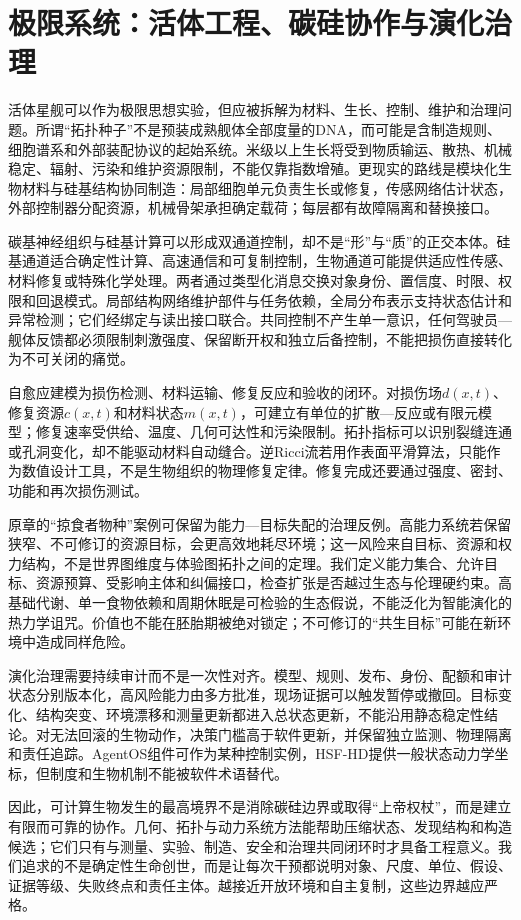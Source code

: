 \section{极限系统：活体工程、碳硅协作与演化治理}
\label{sec:tb_extreme_deduction}

活体星舰可以作为极限思想实验，但应被拆解为材料、生长、控制、维护和治理问题。所谓“拓扑种子”不是预装成熟舰体全部度量的DNA，而可能是含制造规则、细胞谱系和外部装配协议的起始系统。米级以上生长将受到物质输运、散热、机械稳定、辐射、污染和维护资源限制，不能仅靠指数增殖。更现实的路线是模块化生物材料与硅基结构协同制造：局部细胞单元负责生长或修复，传感网络估计状态，外部控制器分配资源，机械骨架承担确定载荷；每层都有故障隔离和替换接口。

碳基神经组织与硅基计算可以形成双通道控制，却不是“形”与“质”的正交本体。硅基通道适合确定性计算、高速通信和可复制控制，生物通道可能提供适应性传感、材料修复或特殊化学处理。两者通过类型化消息交换对象身份、置信度、时限、权限和回退模式。局部结构网络维护部件与任务依赖，全局分布表示支持状态估计和异常检测；它们经绑定与读出接口联合。共同控制不产生单一意识，任何驾驶员—舰体反馈都必须限制刺激强度、保留断开权和独立后备控制，不能把损伤直接转化为不可关闭的痛觉。

自愈应建模为损伤检测、材料运输、修复反应和验收的闭环。对损伤场$d(x,t)$、修复资源$c(x,t)$和材料状态$m(x,t)$，可建立有单位的扩散—反应或有限元模型；修复速率受供给、温度、几何可达性和污染限制。拓扑指标可以识别裂缝连通或孔洞变化，却不能驱动材料自动缝合。逆Ricci流若用作表面平滑算法，只能作为数值设计工具，不是生物组织的物理修复定律。修复完成还要通过强度、密封、功能和再次损伤测试。

原章的“掠食者物种”案例可保留为能力—目标失配的治理反例。高能力系统若保留狭窄、不可修订的资源目标，会更高效地耗尽环境；这一风险来自目标、资源和权力结构，不是世界图维度与体验图拓扑之间的定理。我们定义能力集合、允许目标、资源预算、受影响主体和纠偏接口，检查扩张是否越过生态与伦理硬约束。高基础代谢、单一食物依赖和周期休眠是可检验的生态假说，不能泛化为智能演化的热力学诅咒。价值也不能在胚胎期被绝对锁定；不可修订的“共生目标”可能在新环境中造成同样危险。

演化治理需要持续审计而不是一次性对齐。模型、规则、发布、身份、配额和审计状态分别版本化，高风险能力由多方批准，现场证据可以触发暂停或撤回。目标变化、结构突变、环境漂移和测量更新都进入总状态更新，不能沿用静态稳定性结论。对无法回滚的生物动作，决策门槛高于软件更新，并保留独立监测、物理隔离和责任追踪。AgentOS组件可作为某种控制实例，HSF-HD提供一般状态动力学坐标，但制度和生物机制不能被软件术语替代。

因此，可计算生物发生的最高境界不是消除碳硅边界或取得“上帝权杖”，而是建立有限而可靠的协作。几何、拓扑与动力系统方法能帮助压缩状态、发现结构和构造候选；它们只有与测量、实验、制造、安全和治理共同闭环时才具备工程意义。我们追求的不是确定性生命创世，而是让每次干预都说明对象、尺度、单位、假设、证据等级、失败终点和责任主体。越接近开放环境和自主复制，这些边界越应严格。

